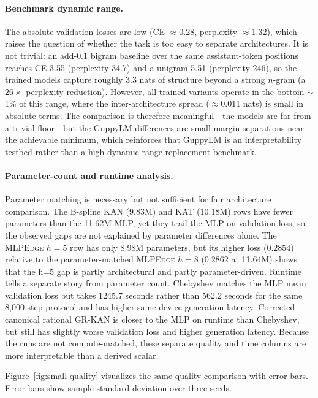 \documentclass[11pt]{article}
\newcommand{\modelname}[1]{\textsc{#1}}
\newcommand{\grkan}{\modelname{GR-KAN}}
\newcommand{\mlpedge}{\modelname{MLPEdge}}
\begin{document}
\paragraph{Benchmark dynamic range.}
The absolute validation losses are low (CE \(\approx\)0.28, perplexity \(\approx\)1.32), which raises the question of whether the task is too easy to separate architectures. It is not trivial: an add-\(0.1\) bigram baseline over the same assistant-token positions reaches CE 3.55 (perplexity 34.7) and a unigram 5.51 (perplexity 246), so the trained models capture roughly 3.3 nats of structure beyond a strong \(n\)-gram (a \(26\times\) perplexity reduction). However, all trained variants operate in the bottom \(\sim\)1\% of this range, where the inter-architecture spread (\(\approx\)0.011 nats) is small in absolute terms. The comparison is therefore meaningful---the models are far from a trivial floor---but the GuppyLM differences are small-margin separations near the achievable minimum, which reinforces that GuppyLM is an interpretability testbed rather than a high-dynamic-range replacement benchmark.

\paragraph{Parameter-count and runtime analysis.}
Parameter matching is necessary but not sufficient for fair architecture comparison. The B-spline KAN (9.83M) and KAT (10.18M) rows have fewer parameters than the 11.62M MLP, yet they trail the MLP on validation loss, so the observed gaps are not explained by parameter differences alone. The \mlpedge{} \(h=5\) row has only 8.98M parameters, but its higher loss (\(0.2854\)) relative to the parameter-matched \mlpedge{} \(h=8\) (\(0.2862\) at 11.64M) shows that the h=5 gap is partly architectural and partly parameter-driven. Runtime tells a separate story from parameter count. Chebyshev matches the MLP mean validation loss but takes 1245.7 seconds rather than 562.2 seconds for the same 8,000-step protocol and has higher same-device generation latency. Corrected canonical rational \grkan{} is closer to the MLP on runtime than Chebyshev, but still has slightly worse validation loss and higher generation latency. Because the runs are not compute-matched, these separate quality and time columns are more interpretable than a derived scalar.

Figure~\ref{fig:small-quality} visualizes the same quality comparison with error bars. Error bars show sample standard deviation over three seeds.
\end{document}
